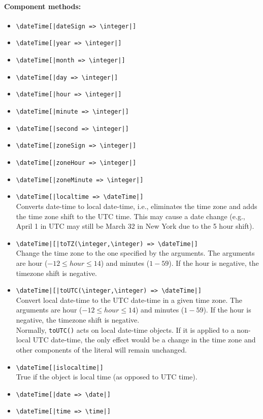 \documentclass[11pt]{article}
\newcommand{\bs}{\textbackslash}
\begin{document}
\paragraph{Component methods:}
\begin{itemize}
\item {\tt \bs{}dateTime[|dateSign => \bs{}integer|]}  
\item {\tt \bs{}dateTime[|year => \bs{}integer|]}  
\item {\tt \bs{}dateTime[|month => \bs{}integer|]}  
\item {\tt \bs{}dateTime[|day => \bs{}integer|]}  
\item {\tt \bs{}dateTime[|hour => \bs{}integer|]}  
\item {\tt \bs{}dateTime[|minute => \bs{}integer|]}  
\item {\tt \bs{}dateTime[|second => \bs{}integer|]}  
\item {\tt \bs{}dateTime[|zoneSign => \bs{}integer|]}  
\item {\tt \bs{}dateTime[|zoneHour => \bs{}integer|]}  
\item {\tt \bs{}dateTime[|zoneMinute => \bs{}integer|]}  
\item {\tt \bs{}dateTime[|localtime => \bs{}dateTime|]}  
  \\
  Converts date-time to local date-time, i.e., eliminates the time zone and
  adds the time zone shift to the UTC time. This may cause a date change
  (e.g., April 1 in UTC may still be March 32 in New York due to the 5 hour
  shift).
\item {\tt \bs{}dateTime|[|toTZ(\bs{}integer,\bs{}integer) => \bs{}dateTime|]}  
  \\
  Change the time zone to the one specified by the arguments. The arguments
  are hour ($-12 \leq hour \leq 14$) and minutes ($1 - 59$).
  If the hour is negative, the timezone shift is negative.
\item {\tt \bs{}dateTime|[|toUTC(\bs{}integer,\bs{}integer) => \bs{}dateTime|]}  
  \\
  Convert local date-time to the UTC date-time in a given time zone.
  The arguments
  are hour ($-12 \leq hour \leq 14$) and minutes ($1 - 59$).
  If the hour is negative, the timezone shift is negative.
  \\
  Normally, \texttt{toUTC()} acts on local date-time objects.
  If it is applied to a non-local UTC date-time, the only effect would be a
  change in the time zone and other components of the literal will remain
  unchanged.
\item {\tt \bs{}dateTime[|islocaltime|]}  
  \\
  True if the object is local time (as opposed to UTC time).
\item {\tt \bs{}dateTime[|date => \bs{}date|]}  
\item {\tt \bs{}dateTime[|time => \bs{}time|]}  
\end{itemize}
\end{document}
